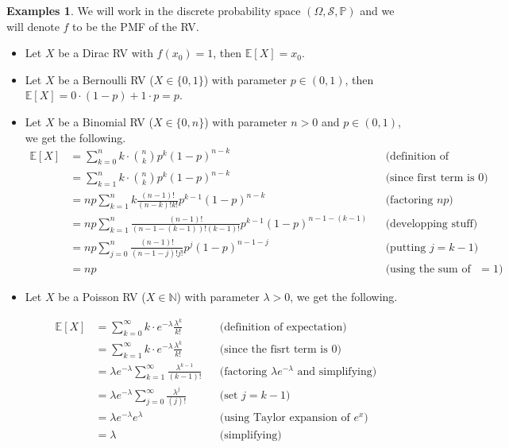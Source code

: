 \documentclass[paper=a4, fontsize=12pt]{scrartcl} %
\theoremstyle{definition}
\newtheorem{exmps}[thm]{Examples}
\theoremstyle{remark}
\newcommand{\N}{\mathbb{N}}
\newcommand{\E}{\mathbb{E}}
\newcommand{\mS}{\mathcal{S}}
\renewcommand{\P}{\mathbb{P}}
\numberwithin{equation}{section} %
\numberwithin{figure}{section} %
\numberwithin{table}{section} %
\begin{document}
\begin{exmps}
	We will work in the discrete probability space $(\Omega, \mS, \P)$ and we will denote $f$ to be the PMF of the RV.
	\begin{itemize}
		\item Let $X$ be a Dirac RV with $f(x_0) = 1$, then $\E[X] = x_0$.
		\item Let $X$ be a Bernoulli RV ($X \in \{0,1\}$) with parameter $p \in (0,1)$, then $\E[X] = 0\cdot (1-p) + 1\cdot p = p$. 
		\item Let $X$ be a Binomial RV ($X \in \{0,n\}$) with parameter $n > 0$ and $p \in (0,1)$, we get the following.
		\begin{align*}
		\E[X] 	&= \sum_{k=0}^n k\cdot \binom{n}{k}p^k(1-p)^{n-k}
		&&\mbox{(definition of expectation)}\\
		&= \sum_{k=1}^n k\cdot \binom{n}{k}p^k(1-p)^{n-k} &&\mbox{(since first term is $0$)}\\
		&= np\sum_{k=1}^nk \frac{(n-1)!}{(n-k)!k!}p^{k-1}(1-p)^{n-k} &&\mbox{(factoring $np$)}\\
		&= np\sum_{k=1}^n \frac{(n-1)!}{(n-1-(k-1))!(k-1)!}p^{k-1}(1-p)^{n-1-(k-1)} &&\mbox{(developping stuff)}\\
		&= np\sum_{j=0}^n \frac{(n-1)!}{(n-1-j)!j!}p^{j}(1-p)^{n-1-j} &&\mbox{(putting $j = k-1$)}\\
		&= np &&\mbox{(using the sum of PMF $=1$)}
		\end{align*}
		\item Let $X$ be a Poisson RV ($X \in \N$) with parameter $\lambda > 0$, we get the following.
		
		\begin{align*}
		\E[X] &= \sum_{k=0}^{\infty} k\cdot e^{-\lambda}\frac{\lambda^k}{k!}
		&&\mbox{(definition of expectation)}\\
		&= \sum_{k=1}^{\infty} k\cdot e^{-\lambda}\frac{\lambda^k}{k!}
		&&\mbox{(since the fisrt term is $0$)}\\
		&= \lambda e^{-\lambda} \sum_{k=1}^{\infty} \frac{\lambda^{k-1}}{(k-1)!}
		&&\mbox{(factoring $\lambda e^{-\lambda}$ and simplifying)}\\
		&= \lambda e^{-\lambda} \sum_{j=0}^{\infty} \frac{\lambda^{j}}{(j)!}
		&&\mbox{(set $j = k-1$)}\\
		&= \lambda e^{-\lambda} e^{\lambda}
		&&\mbox{(using Taylor expansion of $e^x$)}\\
		&= \lambda
		&&\mbox{(simplifying)}
		\end{align*}
		

\end{itemize}
\end{exmps}
\end{document}
